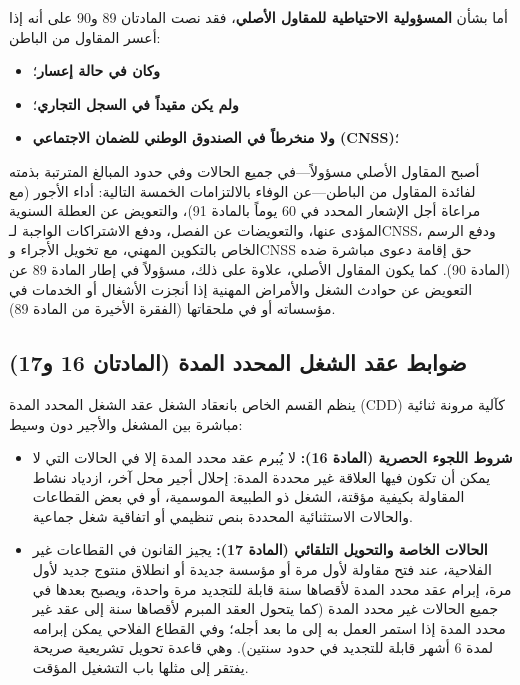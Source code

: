 أما بشأن \textbf{المسؤولية الاحتياطية للمقاول الأصلي}، فقد نصت المادتان \textenglish{89} و\textenglish{90} على أنه إذا أعسر المقاول من الباطن:
\begin{itemize}[leftmargin=*, itemsep=4pt]
    \item \textbf{وكان في حالة إعسار}؛
    \item \textbf{ولم يكن مقيداً في السجل التجاري}؛
    \item \textbf{ولا منخرطاً في الصندوق الوطني للضمان الاجتماعي (\textenglish{CNSS})}؛
\end{itemize}
أصبح المقاول الأصلي مسؤولاً—في جميع الحالات وفي حدود المبالغ المترتبة بذمته لفائدة المقاول من الباطن—عن الوفاء بالالتزامات الخمسة التالية: أداء الأجور (مع مراعاة أجل الإشعار المحدد في \textenglish{60} يوماً بالمادة \textenglish{91})، والتعويض عن العطلة السنوية المؤدى عنها، والتعويضات عن الفصل، ودفع الاشتراكات الواجبة لـ\textenglish{CNSS}، ودفع الرسم الخاص بالتكوين المهني، مع تخويل الأجراء و\textenglish{CNSS} حق إقامة دعوى مباشرة ضده (المادة \textenglish{90}). كما يكون المقاول الأصلي، علاوة على ذلك، مسؤولاً في إطار المادة \textenglish{89} عن التعويض عن حوادث الشغل والأمراض المهنية إذا أنجزت الأشغال أو الخدمات في مؤسساته أو في ملحقاتها (الفقرة الأخيرة من المادة \textenglish{89}).

\subsection{ضوابط عقد الشغل المحدد المدة (المادتان 16 و17)}
ينظم القسم الخاص بانعقاد الشغل عقد الشغل المحدد المدة (\textenglish{CDD}) كآلية مرونة ثنائية مباشرة بين المشغل والأجير دون وسيط:
\begin{itemize}[leftmargin=*, itemsep=4pt]
    \item \textbf{شروط اللجوء الحصرية (المادة \textenglish{16}):} لا يُبرم عقد محدد المدة إلا في الحالات التي لا يمكن أن تكون فيها العلاقة غير محددة المدة: إحلال أجير محل آخر، ازدياد نشاط المقاولة بكيفية مؤقتة، الشغل ذو الطبيعة الموسمية، أو في بعض القطاعات والحالات الاستثنائية المحددة بنص تنظيمي أو اتفاقية شغل جماعية.
    \item \textbf{الحالات الخاصة والتحويل التلقائي (المادة \textenglish{17}):} يجيز القانون في القطاعات غير الفلاحية، عند فتح مقاولة لأول مرة أو مؤسسة جديدة أو انطلاق منتوج جديد لأول مرة، إبرام عقد محدد المدة لأقصاها سنة قابلة للتجديد مرة واحدة، ويصبح بعدها في جميع الحالات غير محدد المدة (كما يتحول العقد المبرم لأقصاها سنة إلى عقد غير محدد المدة إذا استمر العمل به إلى ما بعد أجله؛ وفي القطاع الفلاحي يمكن إبرامه لمدة \textenglish{6} أشهر قابلة للتجديد في حدود سنتين). وهي قاعدة تحويل تشريعية صريحة يفتقر إلى مثلها باب التشغيل المؤقت.
\end{itemize}

